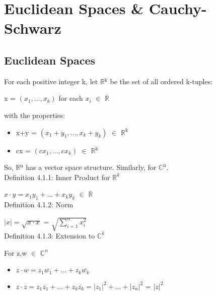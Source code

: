\newpage
\section[Day 4: Euclidean Spaces \& Cauchy-Schwarz]
{Euclidean Spaces \& Cauchy-Schwarz}





\subsection{Euclidean Spaces}

	For each positive integer k, let $\mathbb{R}$$^\text{k}$ be the set of all ordered k-tuples:

	\qquad x = $(x_1,...,x_k)$	\qquad \qquad for each $x_i$ $\in$ $\mathbb{R}$

	with the properties:
	\begin{itemize}[leftmargin=1cm, itemsep=0.1cm]
		\item x+y = $(x_1+y_1,...,x_k+y_k)$ $\in$ $\mathbb{R}^{\text{k}}$
	
		\item cx = $(cx_1,...,cx_k)$ $\in$ $\mathbb{R}$$^\text{k}$
	\end{itemize}

	So, $\mathbb{R}$$^\text{n}$ has a vector space structure. Similarly, for $\mathbb{C}^{\text{n}}$. \\


{ \color{blue} Definition 4.1.1: Inner Product for $\mathbb{R}^k$}

	\begin{adjustbox}{minipage=14cm, right, vspace=0.1cm 0cm}
		$x \cdot y = x_1y_1 + ... + x_ky_k$ $\in$ $\mathbb{R}$ \\
	\end{adjustbox}

{ \color{blue} Definition 4.1.2: Norm }

	\begin{adjustbox}{minipage=14cm, right, vspace=0.1cm 0cm}
		$|x| = \sqrt{x \cdot x}$ = $\sqrt{\sum_{i=1}^n x_i^2}$ \\
	\end{adjustbox}

{ \color{blue} Definition 4.1.3: Extension to $\mathbb{C}^k$ } 

	\hspace{1cm}
	For z,w $\in$ $\mathbb{C}^n$
	
	\begin{itemize}[leftmargin=2cm, itemsep=0.1cm]
		\item $z \cdot w = z_1\overline{w_1} + ... + z_k\overline{w_k}$
	
		\item $z \cdot z = z_1\overline{z_1} + ... + z_k\overline{z_k}
			= |z_1|^2 + ... + |z_n|^2$ = $|z|^2$
	\end{itemize}





